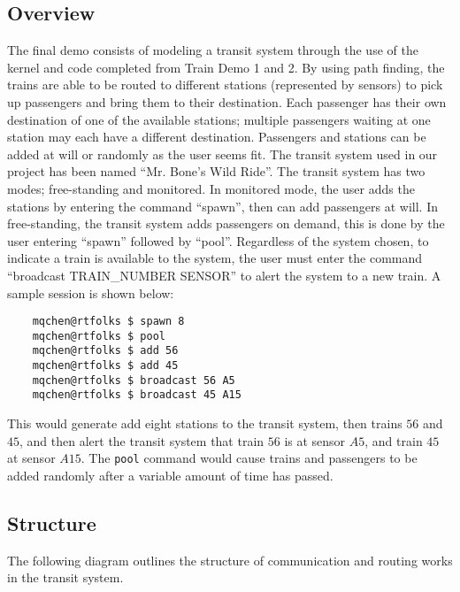 \documentclass[12pt]{article}
\begin{document}
\subsection{Overview}
The final demo consists of modeling a transit system through the use of the kernel and code completed from Train Demo 1 and 2.  By using path finding, the trains are able to be routed to different stations (represented by sensors) to pick up passengers and bring them to their destination.  Each passenger has their own destination of one of the available stations; multiple passengers waiting at one station may each have a different destination.  Passengers and stations can be added at will or randomly as the user seems fit.  The transit system used in our project has been named ``Mr. Bone's Wild Ride''.  The transit system has two modes; free-standing and monitored.  In monitored mode, the user adds the stations by entering the command ``spawn'', then can add passengers at will.  In free-standing, the transit system adds passengers on demand, this is done by the user entering ``spawn'' followed by ``pool''.  Regardless of the system chosen, to indicate a train is available to the system, the user must enter the command ``broadcast TRAIN\_NUMBER SENSOR'' to alert the system to a new train.  A sample session is shown below:
\begin{center}
  \begin{verbatim}
    mqchen@rtfolks $ spawn 8
    mqchen@rtfolks $ pool
    mqchen@rtfolks $ add 56
    mqchen@rtfolks $ add 45
    mqchen@rtfolks $ broadcast 56 A5
    mqchen@rtfolks $ broadcast 45 A15
  \end{verbatim}
\end{center}
\vspace{-0.5cm}This would generate add eight stations to the transit system, then trains $56$ and $45$, and then alert the transit system that train $56$ is at sensor $A5$, and train $45$ at sensor $A15$.  The \texttt{pool} command would cause trains and passengers to be added randomly after a variable amount of time has passed.
\\[1\baselineskip]
\subsection{Structure}
The following diagram outlines the structure of communication and routing works in the transit system.
\begin{center}
  \\[1\baselineskip]
\end{center}
\end{document}
